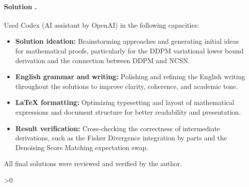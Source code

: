 \documentclass{article}
\newcounter{placeholderCount}
\newcounter{solutionCount}
\newcommand{\solution}[1]{
    \stepcounter{solutionCount}
    \paragraph{Solution \thesolutionCount.}
    {
        #1
    }
}
\begin{document}
\solution{
    Used Codex (AI assistant by OpenAI) in the following capacities:
    \begin{itemize}
        \item \textbf{Solution ideation:} Brainstorming approaches and generating initial ideas for mathematical proofs, particularly for the DDPM variational lower bound derivation and the connection between DDPM and NCSN.
        \item \textbf{English grammar and writing:} Polishing and refining the English writing throughout the solutions to improve clarity, coherence, and academic tone.
        \item \textbf{\LaTeX{} formatting:} Optimizing typesetting and layout of mathematical expressions and document structure for better readability and presentation.
        \item \textbf{Result verification:} Cross-checking the correctness of intermediate derivations, such as the Fisher Divergence integration by parts and the Denoising Score Matching expectation swap.
    \end{itemize}
    All final solutions were reviewed and verified by the author.
}

\ifnum\value{placeholderCount}>0
    \vfill
    \begin{center}
        \color{red} 
    \end{center}
\fi
\end{document}
